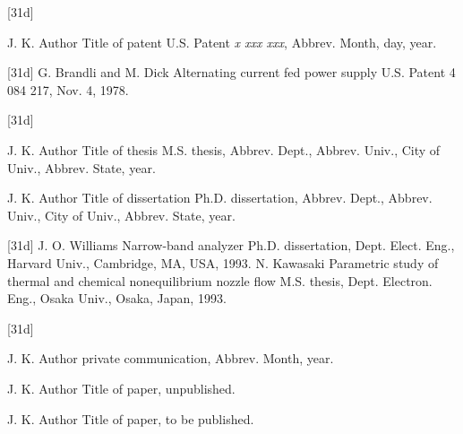 \documentclass[correspondence]{IEEEtaes}
\begin{document}
\vspace*{-12pt}
\begin{thebibliography}{[31d]}
\item[] J. K. Author
\newblock Title of patent
\newblock U.S. Patent \emph{x xxx xxx}, Abbrev. Month, day, year.
\end{thebibliography}

\vspace*{-12pt}
\begin{thebibliography}{[31d]}
\setcounter{enumiv}{17}
   G. Brandli and M. Dick
\newblock Alternating current fed power supply
\newblock U.S. Patent 4 084 217, Nov. 4, 1978.
\end{thebibliography}

\vspace*{-12pt}
\begin{thebibliography}{[31d]}
\item[] J. K. Author
\newblock Title of thesis
\newblock M.S. thesis, Abbrev. Dept., Abbrev. Univ., City of Univ., Abbrev. State, year.\vfill\pagebreak
\item[] J. K. Author
\newblock Title of dissertation
\newblock Ph.D. dissertation, Abbrev. Dept., Abbrev. Univ., City of Univ., Abbrev. State, year.
\end{thebibliography}

\vspace*{-12pt}
\begin{thebibliography}{[31d]}
\setcounter{enumiv}{18}
J. O. Williams
\newblock Narrow-band analyzer
\newblock Ph.D. dissertation, Dept. Elect. Eng., Harvard Univ., Cambridge, MA, USA, 1993.
N. Kawasaki
\newblock Parametric study of thermal and chemical nonequilibrium nozzle flow
\newblock M.S. thesis, Dept. Electron. Eng., Osaka Univ., Osaka, Japan, 1993.
\end{thebibliography}

\vspace*{-12pt}
\begin{thebibliography}{[31d]}
\item[] J. K. Author
\newblock private communication, Abbrev. Month, year.
\item[] J. K. Author
\newblock Title of paper, unpublished.
\item[] J. K. Author
\newblock Title of paper, to be published.
\end{thebibliography}
\end{document}
